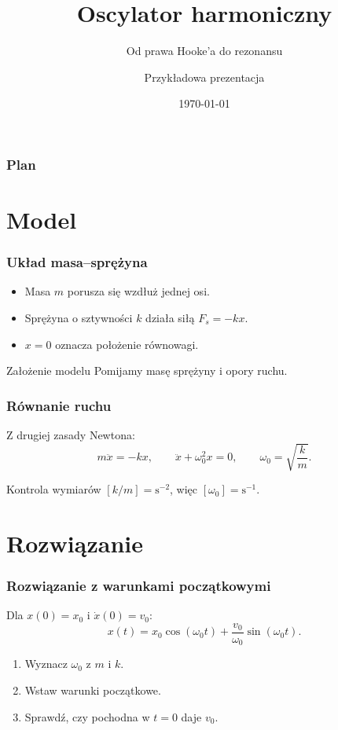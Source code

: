 \documentclass[aspectratio=169]{beamer}
\title{Oscylator harmoniczny}
\subtitle{Od prawa Hooke'a do rezonansu}
\author{Przykładowa prezentacja}
\date{\today}
\begin{document}
\begin{frame}
  \titlepage
\end{frame}

\begin{frame}
  \frametitle{Plan}
  \tableofcontents
\end{frame}

\section{Model}
\begin{frame}
  \frametitle{Układ masa--sprężyna}
  \begin{itemize}
    \item Masa $m$ porusza się wzdłuż jednej osi.
    \item Sprężyna o sztywności $k$ działa siłą $F_s=-kx$.
    \item $x=0$ oznacza położenie równowagi.
  \end{itemize}
  \begin{block}{Założenie modelu}
    Pomijamy masę sprężyny i opory ruchu.
  \end{block}
\end{frame}

\begin{frame}
  \frametitle{Równanie ruchu}
  Z drugiej zasady Newtona:
  \begin{equation*}
    m\ddot x=-kx,\qquad
    \ddot x+\omega_0^2x=0,\qquad
    \omega_0=\sqrt{\frac{k}{m}}.
  \end{equation*}
  \begin{exampleblock}{Kontrola wymiarów}
    $[k/m]=\mathrm{s}^{-2}$, więc $[\omega_0]=\mathrm{s}^{-1}$.
  \end{exampleblock}
\end{frame}

\section{Rozwiązanie}
\begin{frame}
  \frametitle{Rozwiązanie z warunkami początkowymi}
  Dla $x(0)=x_0$ i $\dot x(0)=v_0$:
  \begin{equation*}
    x(t)=x_0\cos(\omega_0t)+
    \frac{v_0}{\omega_0}\sin(\omega_0t).
  \end{equation*}
  \begin{enumerate}
    \item Wyznacz $\omega_0$ z $m$ i $k$.
    \item Wstaw warunki początkowe.
    \item Sprawdź, czy pochodna w $t=0$ daje $v_0$.
  \end{enumerate}
\end{frame}
\end{document}
